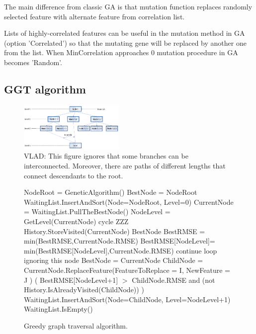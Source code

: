\documentclass[aip,jcp,reprint,amsmath,amssymb,nature]{revtex4-1}
\begin{document}
The main difference from classic GA is that mutation function replaces randomly selected feature with alternate feature from correlation list. 

Lists of highly-correlated features can be useful in the mutation method in GA (option 'Correlated') so that the mutating gene will be replaced by another one from the list. When MinCorrelation approaches 0 mutation procedure in GA becomes 'Random'.

\subsection{GGT algorithm}

\begin{figure}
\includegraphics[width=0.45\textwidth]{media/water_distances_3.eps}
\caption{VLAD: This figure ignores that some branches can be interconnected. Moreover, there are paths of different lengths that connect descendants to the root.}\label{Fig:A_star_tree}
\end{figure}


\begin{figure}
   \begin{algorithmic}[1]
	\State NodeRoot = GeneticAlgorithm() 
	\State BestNode = NodeRoot
	\State WaitingList.InsertAndSort(Node=NodeRoot, Level=0) 
	\Repeat
		\State CurrentNode = WaitingList.PullTheBestNode() 
		\State NodeLevel = GetLevel(CurrentNode)
			\State cycle ZZZ 
		\EndIf
		\State History.StoreVisited(CurrentNode)
			\State \Return BestNode
		\EndIf 
		\State BestRMSE = min(BestRMSE,CurrentNode.RMSE)
		\State BestRMSE[NodeLevel]= min(BestRMSE[NodeLevel],CurrentNode.RMSE)
			\State continue loop ignoring this node
		\Else
			\State BestNode = CurrentNode
		\EndIf
			 
				\State ChildNode = CurrentNode.ReplaceFeature(FeatureToReplace = I, NewFeature = J )
				\If ( BestRMSE[NodeLevel+1] $>$ ChildNode.RMSE and (not History.IsAlreadyVisited(ChildNode)) )
					\State WaitingList.InsertAndSort(Node=ChildNode, Level=NodeLevel+1)
				\EndIf
			\EndFor
		\EndFor
	\Until WaitingList.IsEmpty()
   \end{algorithmic}
\caption{\label{fig:ggta} Greedy graph traversal algorithm.}
\end{figure}
\end{document}

